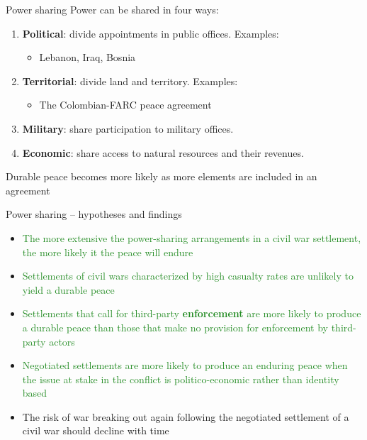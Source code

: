 \documentclass[xcolor=table,usenames,dvipsnames]{beamer}
\begin{document}
\begin{frame}{Power sharing}
Power can be shared in four ways: \pause
\begin{enumerate}
\item \textbf{Political}: \pause divide appointments in public offices.  Examples: \pause
	\begin{itemize}
	\item Lebanon, Iraq, Bosnia \pause
	\end{itemize}
\item \textbf{Territorial}: \pause divide land and territory.
Examples: \pause
	\begin{itemize}
	\item The Colombian-FARC peace agreement \pause
	\end{itemize}
\item \textbf{Military}: \pause share participation to military offices. \pause
\item \textbf{Economic}: \pause share access to natural resources and their revenues.
\end{enumerate} \pause

Durable peace becomes more likely as more elements are included in an agreement
\end{frame}

\begin{frame}{Power sharing -- hypotheses and findings}
\begin{itemize}
\item \textcolor{ForestGreen}{The more extensive the power-sharing arrangements in a  civil war settlement, the more likely it the peace will endure} \pause
\item \textcolor{ForestGreen}{Settlements of civil wars characterized by high casualty rates are unlikely to yield a durable peace} \pause
\item \textcolor{ForestGreen}{Settlements that call for third-party \textbf{enforcement} are more likely to produce a durable peace than those that make no provision for enforcement by third-party actors} \pause
\item \textcolor{ForestGreen}{Negotiated settlements are more likely to produce an enduring peace when the issue at stake in the conflict is politico-economic rather than identity based}  \pause
\item \textcolor{YellowOrange}{The risk of war breaking out again following the negotiated settlement of a civil war should decline with time}
\end{itemize}
\end{frame}
\end{document}
